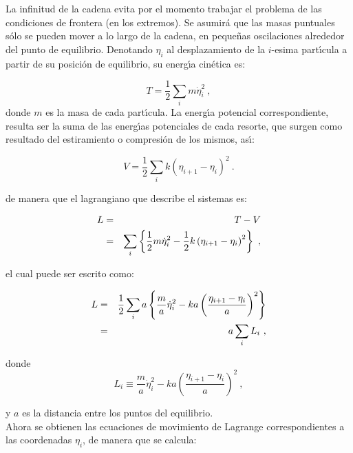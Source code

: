 \noindent
La infinitud de la cadena evita por el momento trabajar el problema de las condiciones de frontera (en los extremos). Se asumir\'{a} que las masas puntuales s\'{o}lo se pueden mover a lo largo de la cadena, en peque\~{n}as oscilaciones alrededor del punto de equilibrio. Denotando $\eta _{i}$ al desplazamiento de la $i$-esima part\'{\i}cula a partir de su posici\'{o}n de equilibrio, su energ\'{\i}a cin\'{e}tica es:

\begin{equation}
T=\frac{1}{2}\sum\limits_{i}m\dot{\eta}_{i}^{2}~,  \label{2.17a}
\end{equation}
\noindent
donde $m$ es la masa de cada part\'{\i}cula. La energ\'{\i}a potencial
correspondiente, resulta ser la suma de las energ\'{\i}as potenciales de
cada resorte, que surgen como resultado del estiramiento o compresi\'{o}n de
los mismos, as\'{\i}:

\begin{equation}
V=\frac{1}{2}\sum\limits_{i}k\left( \eta _{i+1}-\eta _{i}\right) ^{2}~.
\label{2.17b}
\end{equation}

\noindent
de manera que el lagrangiano que describe el sistemas es:

\begin{eqnarray}
L &=&T-V  \notag \\
&=&\sum\limits_{i}\left\{ \frac{1}{2}m\dot{\eta}_{i}^{2}-\frac{1}{2}k\left(
\eta _{i+1}-\eta _{i}\right) ^{2}\right\} ~,
\end{eqnarray}

\noindent
el cual puede ser escrito como:

\begin{eqnarray}
L &=&\frac{1}{2}\sum\limits_{i}a\left\{ \frac{m}{a}\dot{\eta}%
_{i}^{2}-ka\left( \frac{\eta _{i+1}-\eta _{i}}{a}\right) ^{2}\right\}  \notag
\\
&=&a\sum\limits_{i}L_{i}~,
\end{eqnarray}

\noindent
donde 
\begin{equation*}
L_{i}\equiv \frac{m}{a}\dot{\eta}_{i}^{2}-ka\left( \frac{\eta _{i+1}-\eta
_{i}}{a}\right) ^{2}~,
\end{equation*}

\noindent
y $a$ es la distancia entre los puntos del equilibrio.\\


Ahora se obtienen las ecuaciones de movimiento de Lagrange correspondientes
a las coordenadas $\eta _{i}$, de manera que se calcula:

